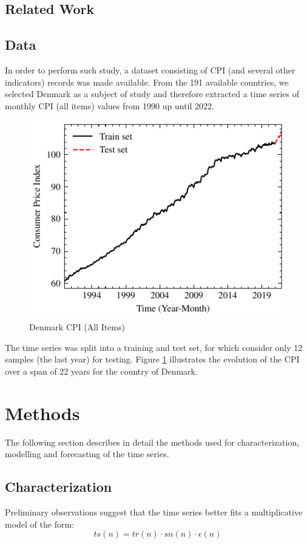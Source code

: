\documentclass[conference]{IEEEtran}
\begin{document}
\subsection{Related Work}
\subsection{Data}
In order to perform such study, a dataset consisting of CPI (and several other indicators) records was made available. From the 191 available countries, we selected Denmark as a subject of study and therefore extracted a time series of monthly CPI (all items) values from 1990 up until 2022.

\begin{figure}[hbtp]
    \centering
    \includegraphics{../figs/cpi.pdf}
    \caption{Denmark CPI (All Items)}
    \label{fig:cpi}
\end{figure}

The time series was split into a training and test set, for which consider only 12 samples (the last year) for testing. Figure \ref{fig:cpi} illustrates the evolution of the CPI over a span of 22 years for the country of Denmark.

\section{Methods}
The following section describes in detail the methods used for characterization, modelling and forecasting of the time series.
\subsection{Characterization}
Preliminary observations suggest that the time series better fits a multiplicative model of the form:
\[
ts(n)=tr(n)\cdot sn(n)\cdot \epsilon(n)
\]
\end{document}
